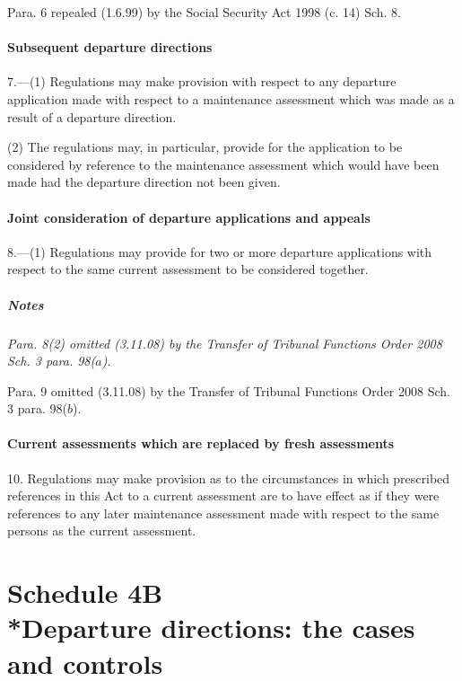 \documentclass[a4paper]{article}
\newcommand\amendment[1]{\subsubsection*{Notes}{\itshape\frenchspacing\footnotesize #1 \par}}
\begin{document}
{{\medskip

Para. 6 repealed (1.6.99) by the Social Security Act 1998 (c. 14) Sch. 8.

}

\subsection*{Subsequent departure directions}

7.—(1) Regulations may make provision with respect to any departure application
made with respect to a maintenance assessment which was made as a result of a departure
direction.

(2) The regulations may, in particular, provide for the application to be considered by reference to the maintenance assessment which would have been made had the departure direction not been given.

\subsection*{Joint consideration of departure applications and appeals}

8.—(1) Regulations may provide for two or more departure applications with respect to the same current assessment to be considered together.

\amendment{
Para. 8(2) omitted (3.11.08) by the Transfer of Tribunal Functions Order 2008  Sch. 3 para. 98($a$).

\medskip

Para. 9 omitted (3.11.08) by the Transfer of Tribunal Functions Order 2008  Sch. 3 para. 98($b$).
}

\subsection*{Current assessments which are replaced by fresh assessments}

10. Regulations may make provision as to the circumstances in which prescribed references in this Act to a current assessment are to have effect as if they were references to any later maintenance assessment made with respect to the same persons as the current assessment.

\part[Schedule 4B --- Departure directions: the cases and controls]{Schedule 4B\\*Departure directions: the cases and controls}

}
\end{document}
